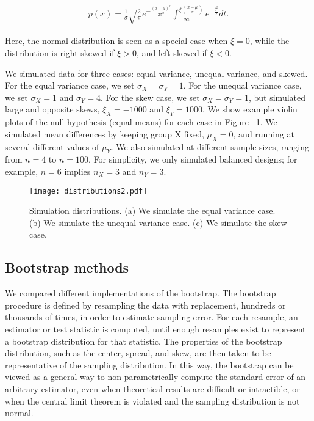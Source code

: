 \documentclass[10pt]{article} %
\begin{document}
\begin{align}
p(x) = \frac{1}{\sigma}\sqrt{\frac{2}{\pi}}e^{-\frac{(x-\mu)^2}{2\sigma^2}}\int_{-\infty}^{\xi(\frac{x-\mu}{\sigma})} e^{-\frac{t^2}{2}} dt.
\end{align}

\noindent Here, the normal distribution is seen as a special case when $\xi = 0$, while the distribution is right skewed if $\xi>0$, and left skewed if $\xi<0$. 

We simulated data for three cases: equal variance, unequal variance, and skewed. For the equal variance case, we set $\sigma_X=\sigma_Y=1$. For the unequal variance case, we set $\sigma_X=1$ and $\sigma_Y=4$. For the skew case, we set  $\sigma_X=\sigma_Y=1$, but simulated large and opposite skews, $\xi_X=-1000$ and $\xi_Y=1000$. We show example violin plots of the null hypothesis (equal means) for each case in Figure ~\ref{fig:cases}. We simulated mean differences by keeping group X fixed, $\mu_X=0$, and running at several different values of $\mu_Y$. We also simulated at different sample sizes, ranging from $n=4$ to $n=100$. For simplicity, we only simulated balanced designs; for example, $n=6$ implies $n_X=3$ and $n_Y=3$.

\begin{figure}
  \texttt{[image: distributions2.pdf]}
  \caption{Simulation distributions. (a) We simulate the equal variance case. (b) We simulate the unequal variance case. (c) We simulate the skew case.}
  \label{fig:cases}
\end{figure}





\subsection{Bootstrap methods}

We compared different implementations of the bootstrap. The bootstrap procedure is defined by resampling the data with replacement, hundreds or thousands of times, in order to estimate sampling error. For each resample, an estimator or test statistic is computed, until enough resamples exist to represent a bootstrap distribution for that statistic. The properties of the bootstrap distribution, such as the center, spread, and skew, are then taken to be representative of the sampling distribution. In this way, the bootstrap can be viewed as a general way to non-parametrically compute the standard error of an arbitrary estimator, even when theoretical results are difficult or intractible, or when the central limit theorem is violated and the sampling distribution is not normal.   
\end{document}
